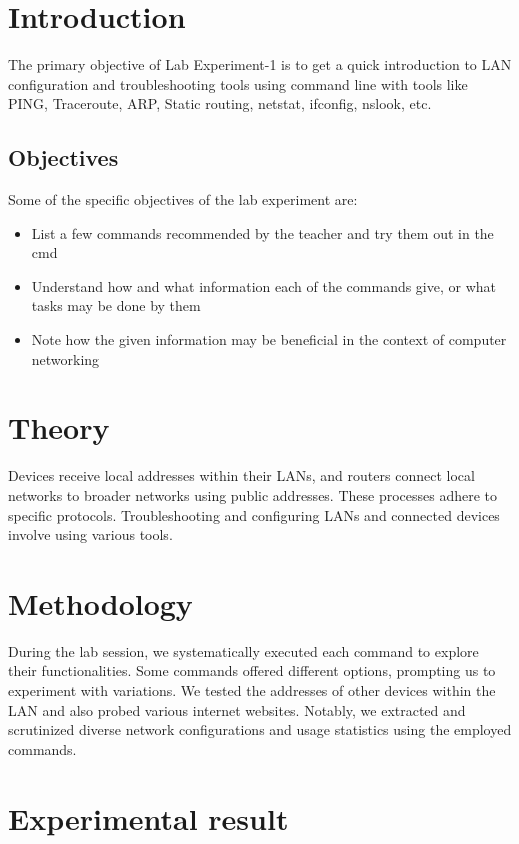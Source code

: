 \documentclass[11pt]{article}
\begin{document}
\section{Introduction}
The primary objective of Lab Experiment-1 is to get a quick introduction to LAN configuration and troubleshooting tools using command line with tools like PING, Traceroute, ARP, Static routing, netstat, ifconfig, nslook, etc.

\subsection{Objectives}
Some of the specific objectives of the lab experiment are:
\begin{itemize}
    \item List a few commands recommended by the teacher and try them out in the cmd
    \item Understand how and what information each of the commands give, or what tasks may be done by them
    \item Note how the given information may be beneficial in the context of computer networking
\end{itemize}

\section{Theory}
 Devices receive local addresses within their LANs, and routers connect local networks to broader networks using public addresses. These processes adhere to specific protocols. Troubleshooting and configuring LANs and connected devices involve using various tools.


\section{Methodology}

During the lab session, we systematically executed each command to explore their functionalities. Some commands offered different options, prompting us to experiment with variations. We tested the addresses of other devices within the LAN and also probed various internet websites. Notably, we extracted and scrutinized diverse network configurations and usage statistics using the employed commands.

\newpage
\section{Experimental result}
\end{document}
